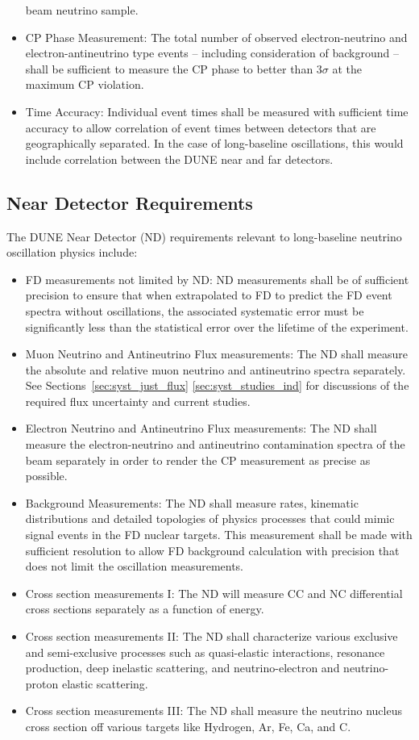 \begin{itemize}
  beam neutrino sample.
 \item CP Phase Measurement: The total number of observed
   electron-neutrino and electron-antineutrino type events --
   including consideration of background -- shall be sufficient to
   measure the CP phase to better than 3$\sigma$ at the maximum CP
   violation.
 \item Time Accuracy: Individual event times shall be measured with
   sufficient time accuracy to allow correlation of event times
   between detectors that are geographically separated. In the case of
   long-baseline oscillations, this would include correlation between
   the DUNE near and far detectors.
\end{itemize}


\subsection{Near Detector Requirements}
\label{sec:physics-lbnosc-nd-req}

The DUNE Near Detector (ND) requirements relevant to long-baseline
neutrino oscillation physics include:
\begin{itemize}
\item FD measurements not limited by ND: ND measurements shall be of
  sufficient precision to ensure that when extrapolated to FD to
  predict the FD event spectra without oscillations, the associated
  systematic error must be significantly less than the statistical
  error over the lifetime of the experiment.
\item Muon Neutrino and Antineutrino Flux measurements: The ND shall
  measure the absolute and relative muon neutrino and antineutrino
  spectra separately.  See Sections~\ref{sec:syst_just_flux}
  \ref{sec:syst_studies_ind} for discussions of the required flux
  uncertainty and current studies.
\item Electron Neutrino and Antineutrino Flux measurements: The ND
  shall measure the electron-neutrino and antineutrino contamination
  spectra of the beam separately in order to render the CP measurement
  as precise as possible.
 \item Background Measurements: The ND shall measure rates, kinematic
   distributions and detailed topologies of physics processes that
   could mimic signal events in the FD nuclear targets. This
   measurement shall be made with sufficient resolution to allow FD
   background calculation with precision that does not limit the
   oscillation measurements.
 \item Cross section measurements I: The ND will measure CC and NC
   differential cross sections separately as a function of energy.
 \item Cross section measurements II: The ND shall characterize
   various exclusive and semi-exclusive processes such as
   quasi-elastic interactions, resonance production, deep inelastic
   scattering, and neutrino-electron and neutrino-proton elastic
   scattering.
 \item Cross section measurements III: The ND shall measure the
   neutrino nucleus cross section off various targets like Hydrogen,
   Ar, Fe, Ca, and C.
\end{itemize}


